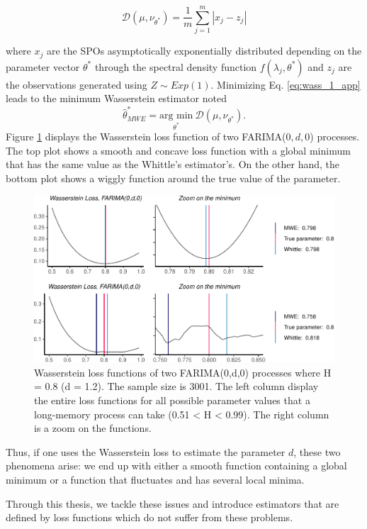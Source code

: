 \documentclass[
  11pt,
]{article}
\begin{document}
\begin{equation}
\mathcal{D}(\mu, \nu_{\theta^*}) = \frac{1}{m} \sum_{j = 1}^{m} |x_j - z_j| 
\label{eq:wass_1_app}
\end{equation}

where \(x_j\) are the SPOs asymptotically exponentially distributed
depending on the parameter vector \(\theta^*\) through the spectral
density function \(f(\lambda_j, \theta^*)\) and \(z_j\) are the
observations generated using \(Z \sim Exp(1)\). Minimizing Eq.
\ref{eq:wass_1_app} leads to the minimum Wasserstein estimator noted \[
\hat \theta^*_{MWE} = \underset{\theta^*}{\text{arg min}} \  \mathcal{D}(\mu, \nu_{\theta^*}).
\] Figure \ref{fig:wasserstein_farima} displays the Wasserstein loss
function of two FARIMA(\(0,d,0\)) processes. The top plot shows a smooth
and concave loss function with a global minimum that has the same value
as the Whittle's estimator's. On the other hand, the bottom plot shows a
wiggly function around the true value of the parameter.

\begin{figure}

{\centering \includegraphics[width=0.6\linewidth]{Master_thesis_V5_files/figure-latex/wasserstein_farima-1} 

}

\caption{Wasserstein loss functions of two FARIMA(0,d,0) processes where H = 0.8 (d = 1.2). The sample size is 3001. The left column display the entire loss functions for all possible parameter values that a long-memory process can take (0.51 < H < 0.99). The right column is a zoom on the functions.}\label{fig:wasserstein_farima}
\end{figure}

Thus, if one uses the Wasserstein loss to estimate the parameter \(d\),
these two phenomena arise: we end up with either a smooth function
containing a global minimum or a function that fluctuates and has
several local minima.

Through this thesis, we tackle these issues and introduce estimators
that are defined by loss functions which do not suffer from these
problems.
\end{document}
